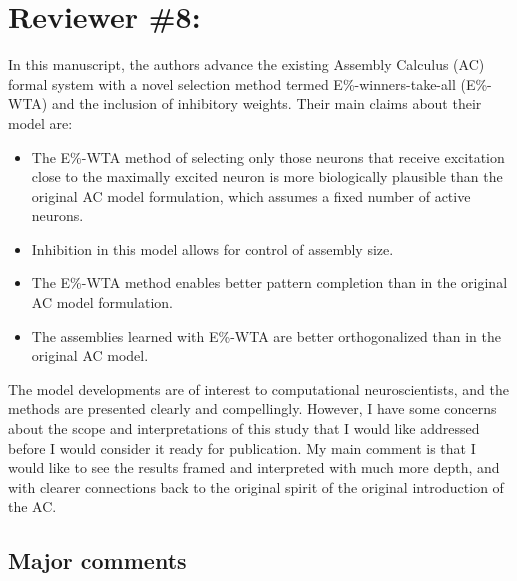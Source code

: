 \documentclass[a4paper, 11pt]{article}
\begin{document}
\section*{Reviewer \#8:}

In this manuscript, the authors advance the existing Assembly Calculus (AC) formal system with a novel selection method termed E\%-winners-take-all (E\%-WTA) and the inclusion of inhibitory weights. Their main claims about their model are:

\begin{itemize}
    \item The E\%-WTA method of selecting only those neurons that receive excitation close to the maximally excited neuron is more biologically plausible than the original AC model formulation, which assumes a fixed number of active neurons.
    \item Inhibition in this model allows for control of assembly size.
    \item The E\%-WTA method enables better pattern completion than in the original AC model formulation.
    \item The assemblies learned with E\%-WTA are better orthogonalized than in the original AC model.
\end{itemize}

The model developments are of interest to computational neuroscientists, and the methods are presented clearly and compellingly. However, I have some concerns about the scope and interpretations of this study that I would like addressed before I would consider it ready for publication. My main comment is that I would like to see the results framed and interpreted with much more depth, and with clearer connections back to the original spirit of the original introduction of the AC.

\subsection*{Major comments}
\end{document}
